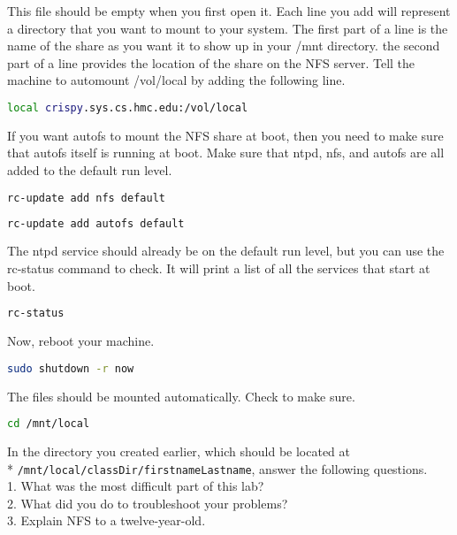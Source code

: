 \documentclass[11pt]{article}
\begin{document}
This file should be empty when you first open it. Each line you add will represent a directory that you want to mount to your system. The first part of a line is the name of the share as you want it to show up in your /mnt directory. the second part of a line provides the location of the share on the NFS server. Tell the machine to automount /vol/local by adding the following line.

\begin{lstlisting}[basicstyle=\ttfamily, backgroundcolor = \color{lightgray}, language = bash, xleftmargin = 0cm, framexleftmargin = 1em]
local crispy.sys.cs.hmc.edu:/vol/local
\end{lstlisting} 	

If you want autofs to mount the NFS share at boot, then you need to make sure that autofs itself is running at boot. Make sure that ntpd, nfs, and autofs are all added to the default run level.
\begin{lstlisting}[basicstyle=\ttfamily, backgroundcolor = \color{lightgray}, language = bash, xleftmargin = 0cm, framexleftmargin = 1em]
rc-update add nfs default
\end{lstlisting} 	

\begin{lstlisting}[basicstyle=\ttfamily, backgroundcolor = \color{lightgray}, language = bash, xleftmargin = 0cm, framexleftmargin = 1em]
rc-update add autofs default
\end{lstlisting} 	

The ntpd service should already be on the default run level, but you can use the rc-status command to check. It will print a list of all the services that start at boot.
\begin{lstlisting}[basicstyle=\ttfamily, backgroundcolor = \color{lightgray}, language = bash, xleftmargin = 0cm, framexleftmargin = 1em]
rc-status
\end{lstlisting} 	

Now, reboot your machine.
\begin{lstlisting}[basicstyle=\ttfamily, backgroundcolor = \color{lightgray}, language = bash, xleftmargin = 0cm, framexleftmargin = 1em]
sudo shutdown -r now
\end{lstlisting} 	

The files should be mounted automatically. Check to make sure.
\begin{lstlisting}[basicstyle=\ttfamily, backgroundcolor = \color{lightgray}, language = bash, xleftmargin = 0cm, framexleftmargin = 1em]
cd /mnt/local
\end{lstlisting} 	

In the directory you created earlier, which should be located at \\* \verb|/mnt/local/classDir/firstnameLastname|, answer the following questions.\\

1. What was the most difficult part of this lab?\\

2. What did you do to troubleshoot your problems?\\

3. Explain NFS to a twelve-year-old.\\
\end{document}
